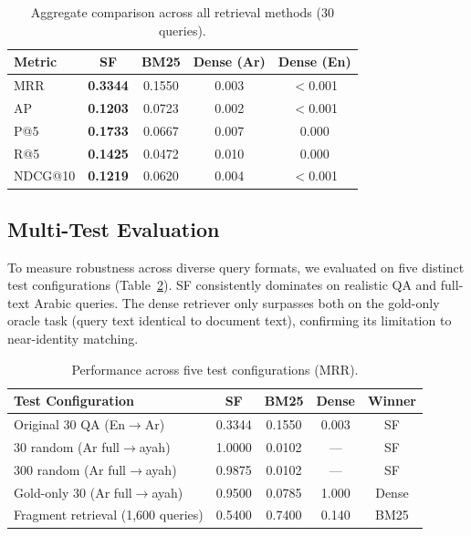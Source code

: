 \documentclass[conference]{IEEEtran}
\begin{document}
\begin{table}[t]
  \centering
  \caption{Aggregate comparison across all retrieval methods (30 queries).}
  \label{tab:main}
  \footnotesize
  \begin{tabular}{lcccc}
    \toprule
    \textbf{Metric} &
    \textbf{\textcolor{sfblue}{SF}} &
    \textbf{BM25} &
    \textbf{Dense (Ar)} &
    \textbf{Dense (En)} \\
    \midrule
    MRR      & \textbf{0.3344} & 0.1550 & 0.003 & $<$0.001 \\
    AP       & \textbf{0.1203} & 0.0723 & 0.002 & $<$0.001 \\
    P@5      & \textbf{0.1733} & 0.0667 & 0.007 & 0.000 \\
    R@5      & \textbf{0.1425} & 0.0472 & 0.010 & 0.000 \\
    NDCG@10  & \textbf{0.1219} & 0.0620 & 0.004 & $<$0.001 \\
    \bottomrule
  \end{tabular}
\end{table}

\subsection{Multi-Test Evaluation}

To measure robustness across diverse query formats, we evaluated on five
distinct test configurations (Table~\ref{tab:multitest}). SF consistently
dominates on realistic QA and full-text Arabic queries. The dense
retriever only surpasses both on the gold-only oracle task (query text
identical to document text), confirming its limitation to near-identity
matching.

\begin{table}[t]
  \centering
  \caption{Performance across five test configurations (MRR).}
  \label{tab:multitest}
  \footnotesize
  \begin{tabular}{lcccc}
    \toprule
    \textbf{Test Configuration} &
    \textbf{\textcolor{sfblue}{SF}} &
    \textbf{BM25} &
    \textbf{Dense} &
    \textbf{Winner} \\
    \midrule
    Original 30 QA (En$\to$Ar) & 0.3344 & 0.1550 & 0.003 & SF \\
    30 random (Ar full$\to$ayah) & 1.0000 & 0.0102 & --- & SF \\
    300 random (Ar full$\to$ayah) & 0.9875 & 0.0102 & --- & SF \\
    Gold-only 30 (Ar full$\to$ayah) & 0.9500 & 0.0785 & 1.000 & Dense \\
    Fragment retrieval (1{,}600 queries) & 0.5400 & 0.7400 & 0.140 & BM25 \\
    \bottomrule
  \end{tabular}
\end{table}
\end{document}
